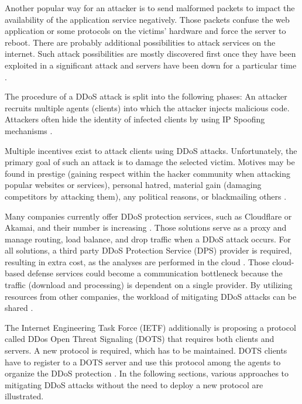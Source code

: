 Another popular way for an attacker is to send malformed packets to impact the availability of the application service negatively. Those packets confuse the web application or some protocols on the victims' hardware and force the server to reboot. There are probably additional possibilities to attack services on the internet. Such attack possibilities are mostly discovered first once they have been exploited in a significant attack and servers have been down for a particular time \cite{Mirkovic2004}.

The procedure of a DDoS attack is split into the following phases: An attacker recruits multiple agents (clients) into which the attacker injects malicious code. Attackers often hide the identity of infected clients by using IP Spoofing mechanisms \cite{Mirkovic2004}.

Multiple incentives exist to attack clients using DDoS attacks. Unfortunately, the primary goal of such an attack is to damage the selected victim. Motives may be found in prestige (gaining respect within the hacker community when attacking popular websites or services), personal hatred, material gain (damaging competitors by attacking them), any political reasons, or blackmailing others \cite{Mansfield-Devine2015, Mirkovic2004}.

Many companies currently offer DDoS protection services, such as Cloudflare or Akamai, and their number is increasing \cite{Pras2016}. Those solutions serve as a proxy and manage routing, load balance, and drop traffic when a DDoS attack occurs. For all solutions, a third party DDoS Protection Service (DPS) provider is required, resulting in extra cost, as the analyses are performed in the cloud \cite{Rodrigues2017}. Those cloud-based defense services could become a communication bottleneck because the traffic (download and processing) is dependent on a single provider. By utilizing resources from other companies, the workload of mitigating DDoS attacks can be shared \cite{Rodrigues2017}.

The Internet Engineering Task Force (IETF) additionally is proposing a protocol called DDos Open Threat Signaling (DOTS) that requires both clients and servers. A new protocol is required, which has to be maintained. DOTS clients have to register to a DOTS server and use this protocol among the agents to organize the DDoS protection \cite{Rodrigues2017}. In the following sections, various approaches to mitigating DDoS attacks without the need to deploy a new protocol are illustrated.

